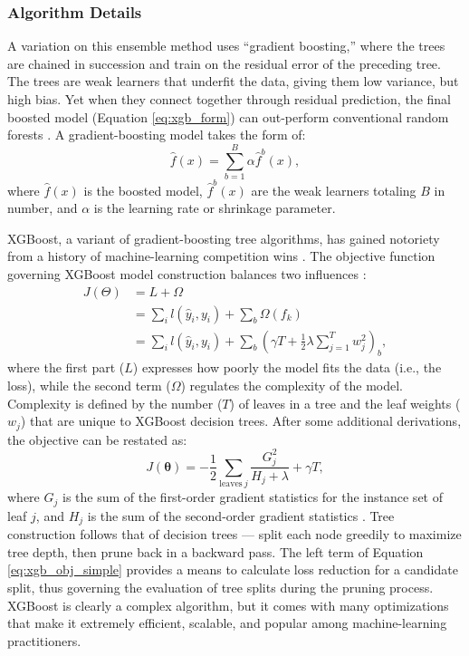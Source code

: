 \subsubsection{Algorithm Details}\label{ch3:xgb_details}

A variation on this ensemble method uses ``gradient boosting,'' where the trees are chained in succession and train on the residual error of the preceding tree. The trees are weak learners that underfit the data, giving them low variance, but high bias. Yet when they connect together through residual prediction, the final boosted model (Equation \ref{eq:xgb_form}) can out-perform conventional random forests \citep[p.\ 323]{james_introduction_2013}. A gradient-boosting model takes the form of:
\begin{equation}
\label{eq:xgb_form}
    \hat{f}(x) = \sum_{b=1}^{B}{\alpha \hat{f}^{b}(x)},
\end{equation}
where $\hat{f}(x)$ is the boosted model, $\hat{f}^b(x)$ are the weak learners totaling $B$ in number, and $\alpha$ is the learning rate or shrinkage parameter. 

XGBoost, a variant of gradient-boosting tree algorithms, has gained notoriety from a history of machine-learning competition wins \citep{chen_dmlcxgboost_2021}. The objective function governing XGBoost model construction balances two influences \citep{chen_xgboost_2016}:
\begin{equation}
\label{eq:xgb_objective}
\begin{aligned}
    J(\Theta) &= L + \Omega \\
    &= \sum_{i}{l(\hat{y}_i,y_i)}+\sum_{b}{\Omega(f_k)} \\
    &= \sum_{i}{l(\hat{y}_i,y_i)}+\sum_{b}{\left({\gamma T}+\frac{1}{2} \lambda \sum_{j=1}^T{w_j^2}\right)_b},
\end{aligned}
\end{equation}
where the first part ($L$) expresses how poorly the model fits the data (i.e., the loss), while the second term ($\Omega$) regulates the complexity of the model. Complexity is defined by the number ($T$) of leaves in a tree and the leaf weights ($w_j$) that are unique to XGBoost decision trees. After some additional derivations, the objective can be restated as:
\begin{equation}
\label{eq:xgb_obj_simple}
    J(\boldsymbol\theta) = -\frac{1}{2}\sum_{{\mathrm {leaves}}~j}{\frac{G_j^2}{H_j + \lambda} + \gamma T},
\end{equation}
where $G_j$ is the sum of the first-order gradient statistics for the instance set of leaf $j$, and $H_j$ is the sum of the second-order gradient statistics \citep{chen_xgboost_2016}. Tree construction follows that of decision trees --- split each node greedily to maximize tree depth, then prune back in a backward pass. The left term of Equation \ref{eq:xgb_obj_simple} provides a means to calculate loss reduction for a candidate split, thus governing the evaluation of tree splits during the pruning process. XGBoost is clearly a complex algorithm, but it comes with many optimizations that make it extremely efficient, scalable, and popular among machine-learning practitioners.

